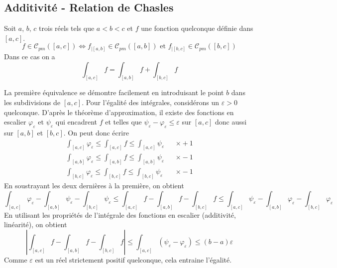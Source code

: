 \subsection{Additivité - Relation de Chasles}
\begin{propn}
 Soit $a$, $b$, $c$ trois réels tels que $a<b<c$ et $f$ une fonction quelconque définie dans $[a,c]$. 
\begin{displaymath}
 f\in\mathcal{C}_{pm}([a,c])\Leftrightarrow
 f_{|[a,b]}\in\mathcal{C}_{pm}([a,b]) \text{ et } f_{|[b,c]}\in\mathcal{C}_{pm}([b,c])
\end{displaymath}
Dans ce cas on a
\begin{displaymath}
 \int_{[a,c]}f = \int_{[a,b]}f + \int_{[b,c]}f
\end{displaymath}
\end{propn}
\begin{demo}
 La première équivalence se démontre facilement en introduisant le point $b$ dans les subdivisions de $[a,c]$.\newline
Pour l'égalité des intégrales, considérons un $\varepsilon>0$ quelconque. D'après le théorème d'approximation, il existe des fonctions en escalier $\varphi_\varepsilon$ et $\psi_\varepsilon$ qui encadrent $f$ et telles que $\psi_\varepsilon -\varphi_\varepsilon \leq \varepsilon$ sur $[a,c]$ donc aussi sur $[a,b]$ et $[b,c]$. On peut donc écrire
\begin{align*}
 \int_{[a,c]}\varphi_\varepsilon \leq \int_{[a,c]}f \leq \int_{[a,c]}\psi_\varepsilon  & &\times +1 \\ 
 \int_{[a,b]}\varphi_\varepsilon \leq \int_{[a,b]}f \leq \int_{[a,b]}\psi_\varepsilon  & & \times -1\\
 \int_{[b,c]}\varphi_\varepsilon \leq \int_{[b,c]}f \leq \int_{[b,c]}\psi_\varepsilon  & & \times -1
\end{align*}
En soustrayant les deux dernières à la première, on obtient
\begin{displaymath}
 \int_{[a,c]}\varphi_\varepsilon - \int_{[a,b]}\psi_\varepsilon - \int_{[b,c]}\psi_\varepsilon
\leq \int_{[a,c]}f -\int_{[a,b]}f - \int_{[b,c]}f \leq
 \int_{[a,c]}\psi_\varepsilon - \int_{[a,b]}\varphi_\varepsilon - \int_{[b,c]}\varphi_\varepsilon 
\end{displaymath}
En utilisant les propriétés de l'intégrale des fonctions en escalier (additivité, linéarité), on obtient
\begin{displaymath}
 \left| \int_{[a,c]}f -\int_{[a,b]}f - \int_{[b,c]}f \right|
\leq \int_{[a,c]}\left(\psi_\varepsilon - \varphi_\varepsilon \right) 
\leq (b-a)\varepsilon
\end{displaymath}
Comme $\varepsilon$ est un réel strictement positif quelconque, cela entraine l'égalité.
\end{demo}

